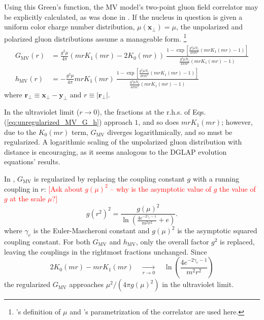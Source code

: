 Using this Green's function, the \gls{MV} model's two-point gluon field correlator may be explicitly calculated, as was done in \cite[Appendix D]{Carrington_2022_Energy_Momentum_Tensor}. If the nucleus in question is given a uniform color charge number distribution, $\mu(\mathbf{x}_\perp) = \mu$, the unpolarized and polarized gluon distributions assume a manageable form. \cite{Carrington_2022,Guerrero_Rodr_guez_2021}\footnote{\cite{Carrington_2022}'s definition of $\mu$ and \cite{Guerrero_Rodr_guez_2021}'s parametrization of the correlator are used here.}
\begin{subequations}
\begin{align}
G_{\text{MV}}(r) & = \frac{g^{2}\mu}{4\pi} ( mrK_{1}(mr) - 2K_{0}(mr) )
~ \frac{1 - \exp \left [\frac{g^{4}\mu N_c}{4\pi m^{2}} (mrK_{1}(mr) - 1) \right ]}{\frac{g^{4}\mu N_c}{4\pi m^{2}} (mrK_{1}(mr) - 1)} \\
h_{\text{MV}}(r) & = - \frac{g^{2}\mu}{4\pi } mrK_{1}(mr) 
~ \frac{1 - \exp \left [ \frac{g^{4}\mu N_c}{4\pi m^{2}} (mrK_{1}(mr) - 1) \right ]}{\frac{g^{4}\mu N_c}{4\pi m^{2}} (mrK_{1}(mr) - 1)}
\end{align}
\label{eq:unregularized_MV_G_h}
\end{subequations}
where $\mathbf{r}_\perp \equiv \mathbf{x}_\perp - \mathbf{y}_\perp$ and $ r \equiv |\mathbf{r}_\perp|$.

In the ultraviolet limit ($r \to 0$), the fractions at the r.h.s. of Eqs. (\ref{eq:unregularized_MV_G_h}) approach $1$, and so does $mrK_1(mr)$; however, due to the $K_0 (mr)$ term, $G_{\text{MV}}$ diverges logarithmically, and so must be regularized. A logarithmic scaling of the unpolarized gluon distribution with distance is encouraging, as it seems analogous to the \gls{DGLAP} evolution equations' results. \cite{Guerrero_Rodr_guez_2021}

In \cite{Guerrero_Rodr_guez_2021}, $G_\text{MV}$ is regularized by replacing the coupling constant $g$ with a running coupling in $r$: \textcolor{red}{[Ask about $g(\mu)^2$ --  why is the asymptotic value of $g$ the value of $g$ at the scale $\mu$?]}
\begin{equation}
	g(r^2)^2 = \frac{g(\mu)^2}{\ln\left( \frac{4e^{-2\gamma_e-1}}{m^2 r^2} + e\right)}.
\end{equation}
where $\gamma_e$ is the Euler-Mascheroni constant and $g(\mu)^2$ is the asymptotic squared coupling constant. For both $G_\text{MV}$ and $h_\text{MV}$, only the overall factor $g^2$ is replaced, leaving the couplings in the rightmost fractions unchanged. Since 
\begin{equation}
2K_0 (mr) - mrK_1(mr) \quad \xrightarrow[r \to 0]{} \quad \ln \left( \frac{4e^{-2\gamma_e-1}}{m^2 r^2} \right)
\end{equation}
the regularized $G_\text{MV}$ approaches $\mu^2/(4 \pi g(\mu)^2)$ in the ultraviolet limit.

